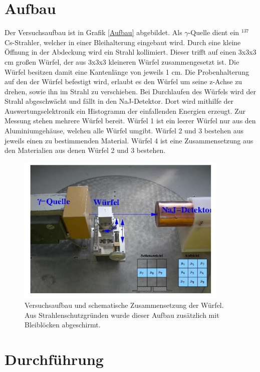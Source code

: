 \section{Aufbau}
\label{sec:Durchführung}

Der Versuchsaufbau ist in Grafik \ref{Aufbau} abgebildet. Als $\gamma$-Quelle dient ein $^{137}$Cs-Strahler, welcher in einer Bleihalterung eingebaut wird. Durch eine kleine Öffnung in der Abdeckung wird ein Strahl kollimiert. Dieser trifft auf einen 3x3x3 cm großen Würfel, der aus 3x3x3 kleineren Würfel zusammengesetzt ist. Die Würfel besitzen damit eine Kantenlänge von jeweils 1 cm.
 Die Probenhalterung auf den der Würfel befestigt wird, erlaubt es den Würfel um seine z-Achse zu drehen, sowie ihn im Strahl zu verschieben. 
 Bei Durchlaufen des Würfels wird der Strahl abgeschwächt und fällt in den NaJ-Detektor. Dort wird mithilfe der Auswertungselektronik ein Histogramm der einfallenden Energien erzeugt.
 Zur Messung stehen mehrere Würfel bereit. Würfel 1 ist ein leerer Würfel nur aus den Aluminiumgehäuse, welchen alle Würfel umgibt. Würfel 2 und 3 bestehen aus jeweils einen zu bestimmenden Material. Würfel 4 ist eine Zusammensetzung aus den Materialien aus denen Würfel 2 und 3 bestehen.

 \begin{figure}
    \centering
    \includegraphics[width=0.9\textwidth]{content/aufbau.JPG}
    \caption{Versuchsaufbau und schematische Zusammensetzung der Würfel. Aus Strahlenschutzgründen wurde dieser Aufbau zusätzlich mit Bleiblöcken abgeschirmt. \cite{Anleitung}}
    \label{fig:Aufbau1}
  \end{figure}

\section{Durchführung}

